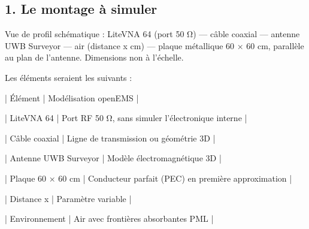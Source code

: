 \documentclass[11pt,a4paper]{article}
\begin{document}
\subsection*{1. Le montage à simuler}
\par\medskip
Vue de profil schématique : LiteVNA 64 (port 50 Ω) — câble coaxial — antenne UWB Surveyor — air (distance x cm) — plaque métallique 60 × 60 cm, parallèle au plan de l'antenne. Dimensions non à l'échelle.\par
\par\medskip
Les éléments seraient les suivants :\par
\par\medskip
| Élément | Modélisation openEMS |\par
| LiteVNA 64 | Port RF 50 Ω, sans simuler l'électronique interne |\par
| Câble coaxial | Ligne de transmission ou géométrie 3D |\par
| Antenne UWB Surveyor | Modèle électromagnétique 3D |\par
| Plaque 60 × 60 cm | Conducteur parfait (PEC) en première approximation |\par
| Distance x | Paramètre variable |\par
| Environnement | Air avec frontières absorbantes PML |\par
\par\medskip
\end{document}
